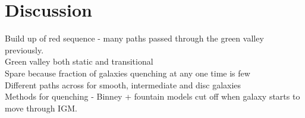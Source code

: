 \documentclass{mn2e}
\begin{document}
%



\section{Discussion}\label{diss}
Build up of red sequence - many paths passed through the green valley previously.
\\ Green valley both static and transitional
\\ Spare because fraction of galaxies quenching at any one time is few
\\ Different paths across for smooth, intermediate and disc galaxies
\\ Methods for quenching - Binney + fountain models cut off when galaxy starts to move through IGM. 
\end{document}

